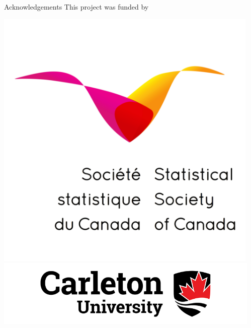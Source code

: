 \documentclass[final]{beamer}
\newlength{\sepwid}
\newlength{\onecolwid}
\begin{document}
\begin{frame}[t]
\begin{columns}[t]
\begin{column}{\onecolwid}
\begin{block}{Acknowledgements}
              This project was funded by 
    	        \begin{center}
    			   \includegraphics[width=5in]{SSC.png}
    	           \includegraphics[width=7in]{carleton.jpg}
    			 \end{center}
    		  \end{block}
        \end{column}
      \begin{column}{\sepwid}\end{column}			%
     \end{columns}
\end{frame}
\end{document}
